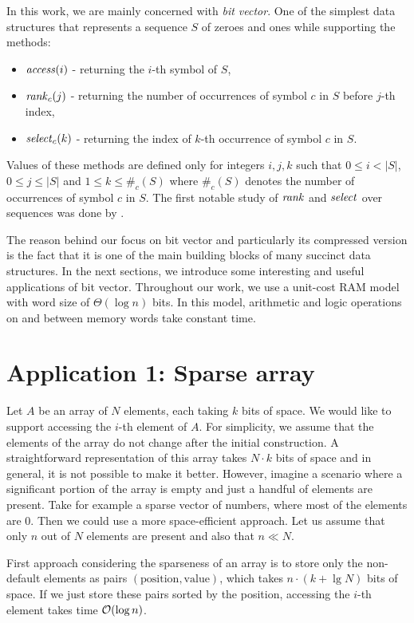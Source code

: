 In this work, we are mainly concerned with \textit{bit vector}. One of the simplest
data structures that represents a sequence $S$ of zeroes and ones while supporting the
methods:
\begin{itemize}
	\item $\mathit{access}(i)$ - returning the $i$-th symbol of $S$,
	\item $\mathit{rank}_c(j)$ - returning the number of occurrences of symbol $c$ in $S$ before $j$-th index,
	\item $\mathit{select}_c(k)$ - returning the index of $k$-th occurrence of symbol $c$ in $S$.
\end{itemize}
Values of these methods are defined only for integers $i, j, k$ such that $0\leq i<|S|$, $0\leq j\leq |S|$
and $1\leq k\leq \#_c(S)$ where $\#_c(S)$ denotes the number of occurrences of symbol $c$ in $S$. The first
notable study of $\mathit{rank}$ and $\mathit{select}$ over sequences was done by \cite{jacobson1988succinct}.

The reason behind our focus on bit vector and particularly its compressed version
is the fact that it is one of the main building blocks of many succinct data structures.
In the next sections, we introduce some interesting and useful applications of bit vector.
Throughout our work, we use a unit-cost RAM model with word size of $\Theta(\log n)$ bits.
In this model, arithmetic and logic operations on and between memory words take constant time.

\section{Application 1: Sparse array}

Let $A$ be an array of $N$ elements, each taking $k$ bits of space. We would like
to support accessing the $i$-th element of $A$. For simplicity, we assume that
the elements of the array do not change after the initial construction. A straightforward
representation of this array takes $N\cdot k$ bits of space and in general, it is not
possible to make it better. However, imagine a scenario where a significant portion
of the array is empty and just a handful of elements are present. Take for example a
sparse vector of numbers, where most of the elements are 0. Then we could use a more
space-efficient approach. Let us assume that only $n$ out of $N$ elements are present
and also that $n\ll N$.

First approach considering the sparseness of an array is to store only the non-default
elements as pairs $(\text{position}, \text{value})$, which takes $n\cdot (k+\lg N)$
bits of space. If we just store these pairs sorted by the position, accessing the $i$-th
element takes time $\mathcal{O}(\log n)$.

